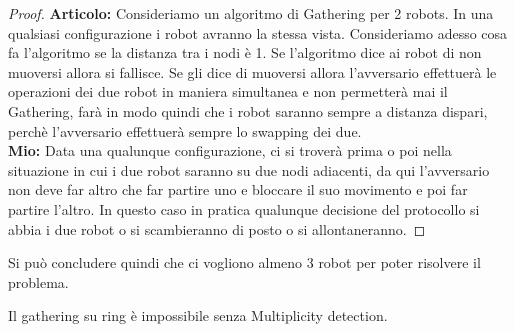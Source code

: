 \begin{proof}
    \textbf{Articolo:} Consideriamo un algoritmo di Gathering per 2 robots. In una
    qualsiasi configurazione i robot avranno la stessa vista. Consideriamo adesso
    cosa fa l'algoritmo se la distanza tra i nodi è 1. Se l'algoritmo dice ai
    robot di non muoversi allora si fallisce. Se gli dice di muoversi allora
    l'avversario effettuerà le operazioni dei due robot in maniera simultanea e
    non permetterà mai il Gathering, farà in modo quindi che i robot saranno
    sempre a distanza dispari, perchè l'avversario effettuerà sempre lo swapping
    dei due.\\
    \textbf{Mio:} Data una qualunque configurazione, ci si troverà prima o poi
    nella situazione in cui i due robot saranno su due nodi adiacenti, da qui
    l'avversario non deve far altro che far partire uno e bloccare il suo
    movimento e poi far partire l'altro. In questo caso in pratica qualunque
    decisione del protocollo si abbia i due robot o si scambieranno di posto o si
    allontaneranno.
\end{proof}

Si può concludere quindi che ci vogliono almeno 3 robot per poter risolvere il
problema.

\begin{theorem}
    Il gathering su ring è impossibile senza Multiplicity detection.
\end{theorem}

